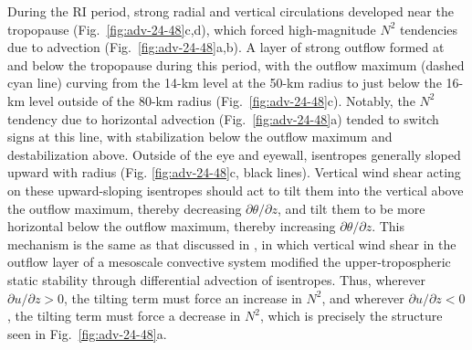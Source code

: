 \documentclass{ametsoc}
\begin{document}
During the RI period, strong radial and vertical circulations developed near the tropopause (Fig.~\ref{fig:adv-24-48}c,d), which forced high-magnitude $N^2$ tendencies due to advection (Fig.~\ref{fig:adv-24-48}a,b).
A layer of strong outflow formed at and below the tropopause during this period, with the outflow maximum (dashed cyan line) curving from the 14-km level at the 50-km radius to just below the 16-km level outside of the 80-km radius (Fig.~\ref{fig:adv-24-48}c).
Notably, the $N^2$ tendency due to horizontal advection (Fig.~\ref{fig:adv-24-48}a) tended to switch signs at this line, with stabilization below the outflow maximum and destabilization above.
Outside of the eye and eyewall, isentropes generally sloped upward with radius (Fig. \ref{fig:adv-24-48}c, black lines).
Vertical wind shear acting on these upward-sloping isentropes should act to tilt them into the vertical above the outflow maximum, thereby decreasing $\partial \theta/\partial z$, and tilt them to be more horizontal below the outflow maximum, thereby increasing $\partial \theta/\partial z$.
This mechanism is the same as that discussed in \cite{TrierSharman}, in which vertical wind shear in the outflow layer of a mesoscale convective system modified the upper-tropospheric static stability through differential advection of isentropes.
Thus, wherever $\partial u/\partial z>0$, the tilting term must force an increase in $N^2$, and wherever $\partial u/\partial z<0$, the tilting term must force a decrease in $N^2$, which is precisely the structure seen in Fig.~\ref{fig:adv-24-48}a.
\end{document}
